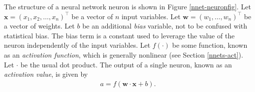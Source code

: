 The structure of a neural network neuron is shown in Figure \ref{nnet-neuronfig}. Let \\${\mathbf{x} = (x_1, x_2, \ldots, x_n)^\intercal}$ be a vector of $n$ input variables. Let $\mathbf{w} = (w_1, \ldots, w_n)^\intercal$ be a vector of weights. Let $b$ be an additional \textit{bias} variable, not to be confused with statistical bias. The bias term is a constant used to leverage the value of the neuron independently of the input variables. Let $f(\cdot)$ be some function, known as an \textit{activation function}, which is generally nonlinear (see Section \ref{nnets-act}). Let $\cdot$ be the usual dot product. The output of a single neuron, known as an \textit{activation value}, is given by
\begin{align}
	a = f(\mathbf{w}\cdot\mathbf{x} + b).
\end{align}



